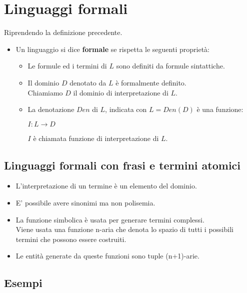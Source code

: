 \documentclass{book}
\begin{document}
    \section{Linguaggi formali}
    Riprendendo la definizione precedente.
    \begin{itemize}
        \item Un linguaggio si dice \textbf{formale} se rispetta le seguenti proprietà:
        \begin{itemize}
            \item Le formule ed i termini di $L$ sono definiti da formule sintattiche.
            \item Il dominio $D$ denotato da $L$ è formalmente definito.\\
                Chiamiamo $D$ il dominio di interpretazione di $L$.
            \item La denotazione $Den$ di $L$, indicata con $L=Den(D)$ è una funzione:
            \begin{center}
                $I:L \to D$
            \end{center}
            $I$ è chiamata funzione di interpretazione di $L$.
        \end{itemize}
    \end{itemize}

    \subsection{Linguaggi formali con frasi e termini atomici}
    \begin{itemize}
        \item L'interpretazione di un termine è un elemento del dominio.
        \item E' possibile avere sinonimi ma non polisemia.
        \item La funzione simbolica è usata per generare termini complessi.\\
                Viene usata una funzione n-aria che denota lo spazio di tutti i possibili termini che possono essere costruiti. 
        \item Le entità generate da queste funzioni sono tuple (n+1)-arie.
    \end{itemize}

    \subsection{Esempi}
\end{document}
